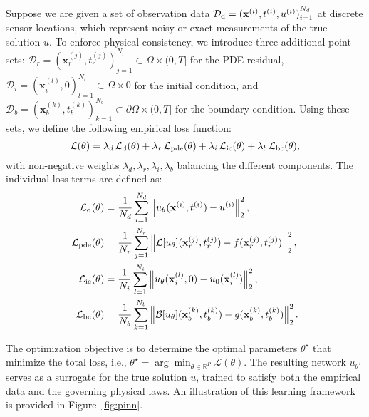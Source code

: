 \documentclass[preprint,12pt]{elsarticle}
\begin{document}
Suppose we are given a set of observation data $\mathcal{D}_{\rm d} = { (\mathbf{x}^{(i)}, t^{(i)}, u^{(i)}) }_{i=1}^{N_d}$ at discrete sensor locations, which represent noisy or exact measurements of the true solution $u$. To enforce physical consistency, we introduce three additional point sets: $\mathcal{D}_r = {(\mathbf{x}^{(j)}_r, t^{(j)}_r)}_{j=1}^{N_r} \subset \Omega \times (0,T]$ for the PDE residual, $\mathcal{D}_i = {(\mathbf{x}^{(l)}_i, 0)}_{l=1}^{N_i} \subset \Omega \times {0}$ for the initial condition, and $\mathcal{D}_b = {(\mathbf{x}^{(k)}_b, t^{(k)}_b)}_{k=1}^{N_b} \subset \partial\Omega \times (0,T]$ for the boundary condition.
Using these sets, we define the following empirical loss function:
\begin{equation}
\mathcal{L}(\theta) 
= \lambda_d \, \mathcal{L}_{\rm d}(\theta) 
+ \lambda_r \, \mathcal{L}_{\mathrm{pde}}(\theta) 
+ \lambda_i \, \mathcal{L}_{\mathrm{ic}}(\theta) 
+ \lambda_b \, \mathcal{L}_{\mathrm{bc}}(\theta),
\label{eq:pinn_loss_full}
\end{equation}
with non-negative weights $\lambda_d, \lambda_r, \lambda_i, \lambda_b$ balancing the different components. The individual loss terms are defined as:
\begin{align}
\mathcal{L}_{\rm d}(\theta) 
&= \frac{1}{N_d} \sum_{i=1}^{N_d} \left\| u_\theta(\mathbf{x}^{(i)}, t^{(i)}) - u^{(i)} \right\|_2^2, \label{eq:loss_data} \\
\mathcal{L}_{\mathrm{pde}}(\theta) 
&= \frac{1}{N_r} \sum_{j=1}^{N_r} \left\| \mathcal{L}[u_\theta](\mathbf{x}^{(j)}_r, t^{(j)}_r) - f(\mathbf{x}^{(j)}_r, t^{(j)}_r) \right\|_2^2, \\
\mathcal{L}_{\mathrm{ic}}(\theta) 
&= \frac{1}{N_i} \sum_{l=1}^{N_i} \left\| u_\theta(\mathbf{x}^{(l)}_i, 0) - u_0(\mathbf{x}^{(l)}_i) \right\|_2^2, \\
\mathcal{L}_{\mathrm{bc}}(\theta) 
&= \frac{1}{N_b} \sum_{k=1}^{N_b} \left\| \mathcal{B}[u_\theta](\mathbf{x}^{(k)}_b, t^{(k)}_b) - g(\mathbf{x}^{(k)}_b, t^{(k)}_b) \right\|_2^2.
\end{align}

The optimization objective is to determine the optimal parameters $\theta^\star$ that minimize the total loss, i.e., $\theta^\star = \arg\min_{\theta \in \mathbb{R}^P} \mathcal{L}(\theta)$. The resulting network $u_{\theta^\star}$ serves as a surrogate for the true solution $u$, trained to satisfy both the empirical data and the governing physical laws. An illustration of this learning framework is provided in Figure~\ref{fig:pinn}.
\end{document}
